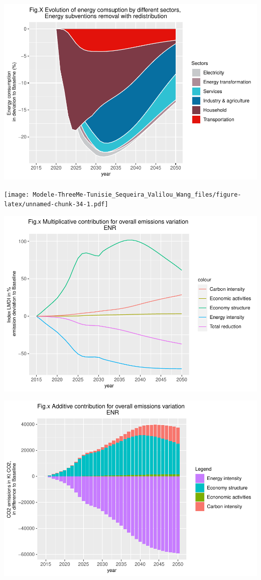 \documentclass[
]{article}
\begin{document}
\includegraphics{Modele-ThreeMe-Tunisie_Sequeira_Valilou_Wang_files/figure-latex/unnamed-chunk-33-1.pdf}

\texttt{[image: Modele-ThreeMe-Tunisie\_Sequeira\_Valilou\_Wang\_files/figure-latex/unnamed-chunk-34-1.pdf]}

\includegraphics{Modele-ThreeMe-Tunisie_Sequeira_Valilou_Wang_files/figure-latex/unnamed-chunk-35-1.pdf}

\includegraphics{Modele-ThreeMe-Tunisie_Sequeira_Valilou_Wang_files/figure-latex/unnamed-chunk-36-1.pdf}
\end{document}

